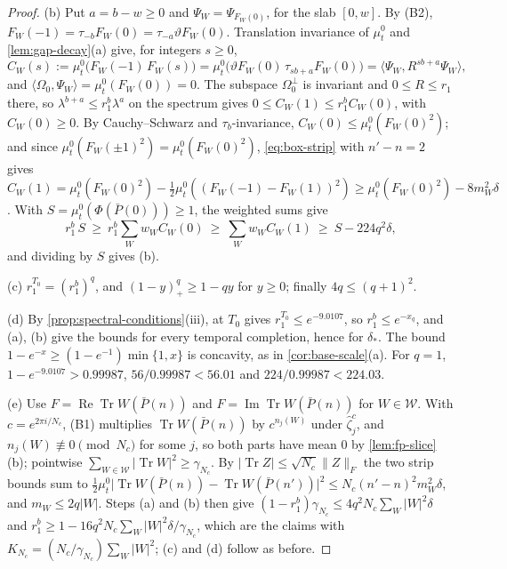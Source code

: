 \documentclass[11pt,a4paper]{amsart}
\theoremstyle{definition}
\theoremstyle{remark}
\numberwithin{equation}{section}
\DeclareMathOperator{\Tr}{Tr}        %
\newcommand{\ip}[2]{\langle #1,#2\rangle}  %
\newcommand{\norm}[1]{\lVert #1\rVert}     %
\newcommand{\abs}[1]{\lvert #1\rvert}      %
\newcommand{\Omegazero}{\Omega_0}          %
\newcommand{\Bcirc}{\text{\upshape(B$^{\circ}$)}}   %
\begin{document}
\begin{proof}
(b) Put $a=b-w\ge0$ and $\Psi_W=\Psi_{F_W(0)}$, for the slab $[0,w]$. By \textup{(B2)}, $F_W(-1)=\tau_{-b}F_W(0)=\tau_{-a}\vartheta F_W(0)$. Translation invariance of $\mu^0_t$ and \cref{lem:gap-decay}(a) give, for integers $s\ge0$,
\[
C_W(s):=\mu^0_t\bigl(F_W(-1)\,F_W(s)\bigr)=\mu^0_t\bigl(\vartheta F_W(0)\,\tau_{sb+a}F_W(0)\bigr)=\ip{\Psi_W}{R^{sb+a}\Psi_W},
\]
and $\ip{\Omegazero}{\Psi_W}=\mu^0_t(F_W(0))=0$. The subspace $\Omegazero^\perp$ is invariant and $0\le R\le r_1$ there, so $\lambda^{b+a}\le r_1^b\lambda^a$ on the spectrum gives $0\le C_W(1)\le r_1^bC_W(0)$, with $C_W(0)\ge0$. By Cauchy--Schwarz and $\tau_b$-invariance, $C_W(0)\le\mu^0_t(F_W(0)^2)$; and since $\mu^0_t(F_W(\pm1)^2)=\mu^0_t(F_W(0)^2)$, \eqref{eq:box-strip} with $n'-n=2$ gives $C_W(1)=\mu^0_t(F_W(0)^2)-\frac12\mu^0_t((F_W(-1)-F_W(1))^2)\ge\mu^0_t(F_W(0)^2)-8m_W^2\delta$. With $S=\mu^0_t(\Phi(\bar P(0)))\ge1$, the weighted sums give
\[
r_1^b\,S\ \ge\ r_1^b\sum_Ww_WC_W(0)\ \ge\ \sum_Ww_WC_W(1)\ \ge\ S-224q^2\delta ,
\]
and dividing by $S$ gives (b).

(c) $r_1^{T_0}=(r_1^b)^q$, and $(1-y)_+^q\ge1-qy$ for $y\ge0$; finally $4q\le(q+1)^2$.

(d) By \cref{prop:spectral-conditions}(iii), \Bcirc{} at $T_0$ gives $r_1^{T_0}\le e^{-9.0107}$, so $r_1^b\le e^{-x_q}$, and (a), (b) give the bounds for every temporal completion, hence for $\delta_*$. The bound $1-e^{-x}\ge(1-e^{-1})\min\{1,x\}$ is concavity, as in \cref{cor:base-scale}(a). For $q=1$, $1-e^{-9.0107}>0.99987$, $56/0.99987<56.01$ and $224/0.99987<224.03$.

(e) Use $F=\operatorname{Re}\Tr W(\bar P(n))$ and $F=\operatorname{Im}\Tr W(\bar P(n))$ for $W\in\mathcal W$. With $c=e^{2\pi i/N_c}$, \textup{(B1)} multiplies $\Tr W(\bar P(n))$ by $c^{n_j(W)}$ under $\hat\zeta^c_j$, and $n_j(W)\not\equiv0\pmod{N_c}$ for some $j$, so both parts have mean $0$ by \cref{lem:fp-slice}(b); pointwise $\sum_{W\in\mathcal W}\abs{\Tr W}^2\ge\gamma_{N_c}$. By $\abs{\Tr Z}\le\sqrt{N_c}\norm Z_F$ the two strip bounds sum to $\frac12\mu^0_t\abs{\Tr W(\bar P(n))-\Tr W(\bar P(n'))}^2\le N_c(n'-n)^2m_W^2\delta$, and $m_W\le2q\abs W$. Steps (a) and (b) then give $(1-r_1^b)\gamma_{N_c}\le4q^2N_c\sum_W\abs W^2\delta$ and $r_1^b\ge1-16q^2N_c\sum_W\abs W^2\delta/\gamma_{N_c}$, which are the claims with $K_{N_c}=(N_c/\gamma_{N_c})\sum_W\abs W^2$; (c) and (d) follow as before.
\end{proof}
\end{document}
